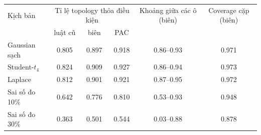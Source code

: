 \begin{tabular}{lccccc}
\toprule
Kịch bản & \multicolumn{3}{c}{Tỉ lệ topology thỏa điều kiện} & Khoảng giữa các ô (biên) & Coverage cặp (biên)\\
 & luật cũ & biên & PAC & & \\
\midrule
Gaussian sạch & 0.805 & 0.897 & 0.918 & 0.86--0.93 & 0.971 \\
Student-$t_4$ & 0.824 & 0.909 & 0.927 & 0.86--0.94 & 0.973 \\
Laplace & 0.812 & 0.901 & 0.921 & 0.87--0.95 & 0.972 \\
Sai số đo 10\% & 0.642 & 0.776 & 0.810 & 0.53--0.93 & 0.948 \\
Sai số đo 30\% & 0.363 & 0.501 & 0.544 & 0.03--0.88 & 0.878 \\
\bottomrule
\end{tabular}
